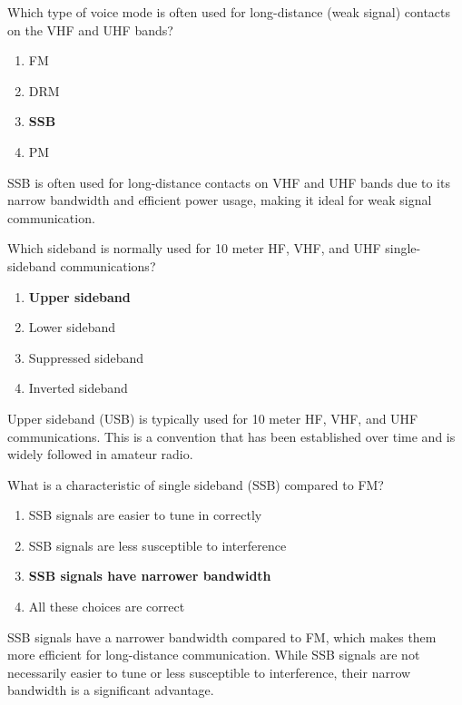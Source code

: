 \begin{tcolorbox}[colback=gray!10!white,colframe=black!75!black,title={T8A03}]
    Which type of voice mode is often used for long-distance (weak signal) contacts on the VHF and UHF bands?
    \begin{enumerate}[label=\Alph*),noitemsep]
        \item FM
        \item DRM
        \item \textbf{SSB}
        \item PM
    \end{enumerate}
\end{tcolorbox}
SSB is often used for long-distance contacts on VHF and UHF bands due to its narrow bandwidth and efficient power usage, making it ideal for weak signal communication.

\begin{tcolorbox}[colback=gray!10!white,colframe=black!75!black,title={T8A06}]
    Which sideband is normally used for 10 meter HF, VHF, and UHF single-sideband communications?
    \begin{enumerate}[label=\Alph*),noitemsep]
        \item \textbf{Upper sideband}
        \item Lower sideband
        \item Suppressed sideband
        \item Inverted sideband
    \end{enumerate}
\end{tcolorbox}
Upper sideband (USB) is typically used for 10 meter HF, VHF, and UHF communications. This is a convention that has been established over time and is widely followed in amateur radio.

\begin{tcolorbox}[colback=gray!10!white,colframe=black!75!black,title={T8A07}]
    What is a characteristic of single sideband (SSB) compared to FM?
    \begin{enumerate}[label=\Alph*),noitemsep]
        \item SSB signals are easier to tune in correctly
        \item SSB signals are less susceptible to interference
        \item \textbf{SSB signals have narrower bandwidth}
        \item All these choices are correct
    \end{enumerate}
\end{tcolorbox}
SSB signals have a narrower bandwidth compared to FM, which makes them more efficient for long-distance communication. While SSB signals are not necessarily easier to tune or less susceptible to interference, their narrow bandwidth is a significant advantage.

